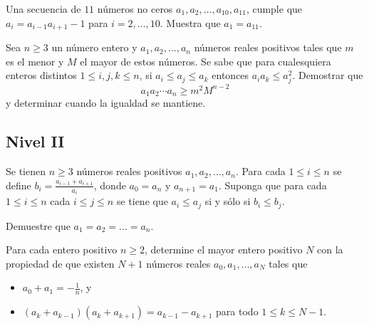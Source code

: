 \documentclass[11pt]{scrartcl}
\newcommand{\thmdifficulty}{0}
\newcommand{\problemdiff}[1]{\renewcommand{\thmdifficulty}{#1}}
\begin{document}
\problemdiff{3}
\begin{problem}
    Una secuencia de $11$ números no ceros $a_1,a_2,\ldots, a_{10},a_{11}$, cumple que $a_i=a_{i-1}a_{i+1}-1$ para $i=2,\ldots, 10$. Muestra que $a_1=a_{11}$.
\end{problem}


\problemdiff{3.5}
\begin{problem}
    
    Sea $n \geq 3$ un número entero y $a_1,a_2,...,a_n$ números reales positivos tales que $m$ es el menor y $M$ el mayor de estos números. Se sabe que para cualesquiera enteros distintos $1 \leq i,j,k \leq n$, si $a_i \leq a_j \leq a_k$ entonces $a_ia_k \leq a_j^2$. Demostrar que
\[ a_1a_2 \cdots a_n \geq m^2M^{n-2} \]
y determinar cuando la igualdad se mantiene.

\end{problem}


\subsection{Nivel II}

\problemdiff{4}
\begin{problem}
    
    Se tienen $n\geq 3$ números reales positivos $a_1,a_2,\dots,a_n$. Para cada $1\leq i\leq n$ se define $b_i=\frac{a_{i-1}+a_{i+1}}{a_i}$, donde $a_0=a_n$ y $a_{n+1}=a_1$. Suponga que para cada $1\leq i\leq n$ cada $i\leq j\leq n$ se tiene que $a_i\leq a_j$ si y sólo si $b_i\leq b_j$.  \newline 

Demuestre que $a_1=a_2=\dots =a_n$.
\end{problem}


\problemdiff{4}
\begin{problem}
    
    Para cada entero positivo $n \ge 2$, determine el mayor entero positivo $N$ con la propiedad de que existen $N +1$ números reales $a_0,a_1,\dots,a_N$ tales que
 \begin{itemize} 
 \item  $a_0+a_1=-\frac 1n$, y
 \item  $(a_k+a_{k-1})(a_k+a_{k+1})=a_{k-1}-a_{k+1}$ para todo $1\leq k \leq N-1$.
 \end{itemize} 
    
\end{problem}
\end{document}
